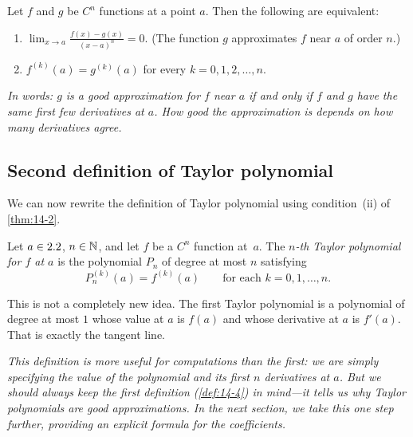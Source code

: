 \begin{theorem}
\label{thm:14-2}
Let $f$ and $g$ be $C^{n}$ functions at a point $a$.  Then the following are equivalent:
\begin{enumerate}[label=(\roman*)]
  \item $\displaystyle\lim_{x\to a}\frac{f(x)-g(x)}{(x-a)^{n}}=0$. \quad (The function $g$ approximates $f$ near $a$ of order $n$.)
  \item $f^{(k)}(a) = g^{(k)}(a)$ for every $k=0,1,2,\ldots,n$.
\end{enumerate}
\end{theorem}

\textit{In words: $g$ is a good approximation for $f$ near $a$ if and only if $f$ and $g$ have the same first few derivatives at $a$.  How good the approximation is depends on how many derivatives agree.}

\subsection*{Second definition of Taylor polynomial}

We can now rewrite the definition of Taylor polynomial using condition~(ii) of \cref{thm:14-2}.

\begin{definition}
\label{def:14-6}
Let $a\in2.2$, $n\in\mathbb{N}$, and let $f$ be a $C^{n}$ function at~$a$.  The \emph{$n$-th Taylor polynomial for $f$ at $a$} is the polynomial $P_{n}$ of degree at most $n$ satisfying
\[
  P_{n}^{(k)}(a) = f^{(k)}(a) \qquad\text{for each } k=0,1,\ldots,n.
\]
\end{definition}

\begin{remark}
This is not a completely new idea.  The first Taylor polynomial is a polynomial of degree at most $1$ whose value at $a$ is $f(a)$ and whose derivative at $a$ is $f'(a)$.  That is exactly the tangent line.
\end{remark}

\textit{This definition is more useful for computations than the first: we are simply specifying the value of the polynomial and its first $n$ derivatives at $a$.  But we should always keep the first definition (\cref{def:14-4}) in mind---it tells us \emph{why} Taylor polynomials are good approximations.  In the next section, we take this one step further, providing an explicit formula for the coefficients.}

